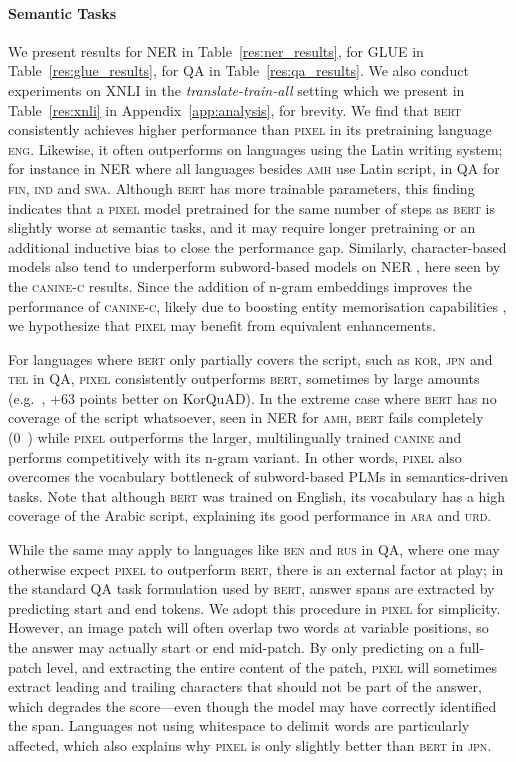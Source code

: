 \documentclass{article}
\newcommand{\model}{\textsc{pixel}\xspace}
\newcommand{\arabi}{\textsc{ara}\xspace}
\newcommand{\english}{\textsc{eng}\xspace}
\newcommand{\japanese}{\textsc{jpn}\xspace}
\newcommand{\korean}{\textsc{kor}\xspace}
\newcommand{\amharic}{\textsc{amh}\xspace}
\newcommand{\swahili}{\textsc{swa}\xspace}
\newcommand{\russian}{\textsc{rus}\xspace}
\newcommand{\urdu}{\textsc{urd}\xspace}
\newcommand{\bengali}{\textsc{ben}\xspace}
\newcommand{\finnish}{\textsc{fin}\xspace}
\newcommand{\indonesian}{\textsc{ind}\xspace}
\newcommand{\telugu}{\textsc{tel}\xspace}
\begin{document}
\paragraph{Semantic Tasks} We present results for NER in Table~\ref{res:ner_results}, for GLUE in Table~\ref{res:glue_results}, for QA in Table~\ref{res:qa_results}.
We also conduct experiments on XNLI in the \emph{translate-train-all} setting which we present in Table~\ref{res:xnli} in Appendix~\ref{app:analysis}, for brevity.
We find that \textsc{bert} consistently achieves higher performance than \model in its pretraining language \english. Likewise, it often outperforms on languages using the Latin writing system; for instance in NER where all languages besides \amharic use Latin script, in QA for \finnish, \indonesian and \swahili.
Although \textsc{bert} has more trainable parameters, this finding indicates that a \model model pretrained for the same number of steps as \textsc{bert} is slightly worse at semantic tasks, and it may require longer pretraining or an additional inductive bias to close the performance gap. 
Similarly, character-based models also tend to underperform subword-based models on NER \citep{keren-etal-2022-breaking}, here seen by the \textsc{canine-c} results.
Since the addition of n-gram embeddings improves the performance of \textsc{canine-c}, likely due to boosting entity memorisation capabilities \citep{DBLP:journals/tacl/ClarkGTW22}, we hypothesize that \model may benefit from equivalent enhancements.


For languages where \textsc{bert} only partially covers the script, such as \korean, \japanese and \telugu in QA,
\model consistently outperforms \textsc{bert}, sometimes by large amounts (e.g.\ , +63  points better on KorQuAD). In the extreme case where \textsc{bert} has no coverage of the script whatsoever, seen in NER for \amharic, \textsc{bert} fails completely (0~) while \model outperforms the larger, multilingually trained \textsc{canine} and performs competitively with its n-gram variant. In other words, \model also overcomes the vocabulary bottleneck of subword-based PLMs in semantics-driven tasks.
Note that although \textsc{bert} was trained on English, its vocabulary has a high coverage of the Arabic script, explaining its good performance in \arabi and \urdu.\footnotemark

While the same may apply to languages like \bengali and \russian in QA, where one may otherwise expect \model to outperform \textsc{bert}, there is an external factor at play; in the standard QA task formulation used by \textsc{bert}, answer spans are extracted by predicting start and end tokens. We adopt this procedure in \model for simplicity. However, an image patch will often overlap two words at variable positions, so the answer may actually start or end mid-patch. By only predicting on a full-patch level, and extracting the entire content of the patch, \model will sometimes extract leading and trailing characters that should not be part of the answer, which degrades the  score---even though the model may have correctly identified the span. Languages not using whitespace to delimit words are particularly affected, which also explains why \model is only slightly better than \textsc{bert} in \japanese.
\end{document}
